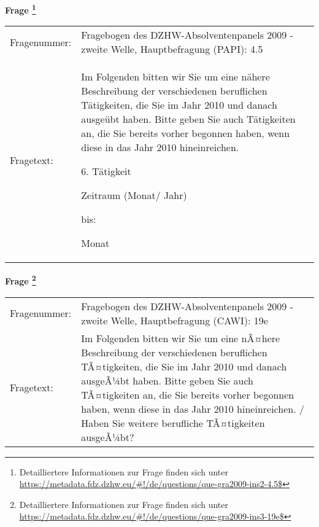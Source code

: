 				\vspace*{0.5cm}
                \noindent\textbf{Frage
	                \footnote{Detailliertere Informationen zur Frage finden sich unter
		              \url{https://metadata.fdz.dzhw.eu/\#!/de/questions/que-gra2009-ins2-4.5$}}}\\
				\begin{tabularx}{\hsize}{@{}lX}
					Fragenummer: &
					  Fragebogen des DZHW-Absolventenpanels 2009 - zweite Welle, Hauptbefragung (PAPI):
					  4.5
 \\
					Fragetext: & Im Folgenden bitten wir Sie um eine nähere Beschreibung der verschiedenen beruflichen Tätigkeiten, die Sie im Jahr 2010 und danach ausgeübt haben. Bitte geben Sie auch Tätigkeiten an, die Sie bereits vorher begonnen haben, wenn diese in das Jahr 2010 hineinreichen.\par  6. Tätigkeit\par  Zeitraum (Monat/ Jahr)\par  bis:\par  Monat \\
				\end{tabularx}
				\vspace*{0.5cm}
                \noindent\textbf{Frage
	                \footnote{Detailliertere Informationen zur Frage finden sich unter
		              \url{https://metadata.fdz.dzhw.eu/\#!/de/questions/que-gra2009-ins3-19e$}}}\\
				\begin{tabularx}{\hsize}{@{}lX}
					Fragenummer: &
					  Fragebogen des DZHW-Absolventenpanels 2009 - zweite Welle, Hauptbefragung (CAWI):
					  19e
 \\
					Fragetext: & Im Folgenden bitten wir Sie um eine nÃ¤here Beschreibung der verschiedenen beruflichen TÃ¤tigkeiten, die Sie im Jahr 2010 und danach ausgeÃ¼bt haben. Bitte geben Sie auch TÃ¤tigkeiten an, die Sie bereits vorher begonnen haben, wenn diese in das Jahr 2010 hineinreichen. / Haben Sie weitere berufliche TÃ¤tigkeiten ausgeÃ¼bt? \\
				\end{tabularx}





